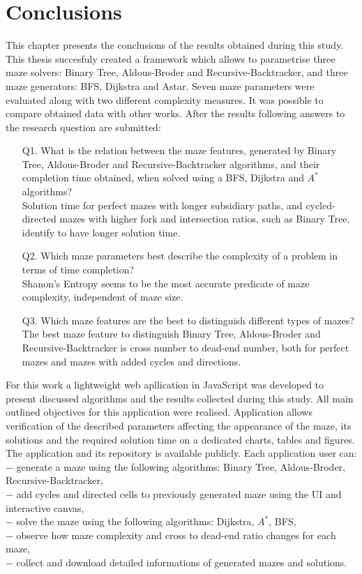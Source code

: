\chapter{Conclusions}\label{cha:Conclusions}
This chapter presents the conclusions of the results obtained during this study. This thesis succesfuly created a framework which allows to parametrise 
three maze solvers: Binary Tree, Aldous-Broder and Recursive-Backtracker, and three maze generators: BFS, Dijkstra and Astar.
Seven maze parameters were evaluated along with two different complexity measures. It was possible to compare obtained data with other works. After the
results following answers to the research question are submitted:
\begin{enumerate}
    \item [Q1.] What is the relation between the maze features, generated by Binary Tree, Aldous-Broder and Recursive-Backtracker algorithms,
     and their completion time obtained, when solved using a BFS, Dijkstra and $A^*$ algorithms?\\
     Solution time for perfect mazes with longer subsidiary paths, and cycled-directed mazes with higher fork and intersection ratios, such as Binary Tree,
     identify to have longer solution time.
    \item [Q2.] Which maze parameters best describe the complexity of a problem in terms of time completion?\\
    Shanon's Entropy seems to be the most accurate predicate of maze complexity, independent of maze size. 
    \item [Q3.] Which maze features are the best to distinguish different types of mazes?\\
    The best maze feature to distinguish Binary Tree, Aldous-Broder and Recursive-Backtracker is cross number to dead-end number, both 
    for perfect mazes and mazes with added cycles and directions.
\end{enumerate}
\indent For this work a lightweight web apllication in JavaScript was developed to present discussed algorithms and the results collected during this study.
All main outlined objectives for this application were realised. Application allows verification of the described parameters affecting the appearance of
the maze, its solutions and the required solution time on a dedicated charts, tables and figures. The application and its repository is available publicly.\newline
Each application user can:\\
$-$ generate a maze using the following algorithms: Binary Tree, Aldous-Broder, Recursive-Backtracker,\\
$-$ add cycles and directed cells to previously generated maze using the UI and interactive canvas,\\
$-$ solve the maze using the following algorithms: Dijkstra, $A^*$, BFS,\\
$-$ observe how maze complexity and cross to dead-end ratio changes for each maze,\\
$-$ collect and download detailed informations of generated mazes and solutions.\\





